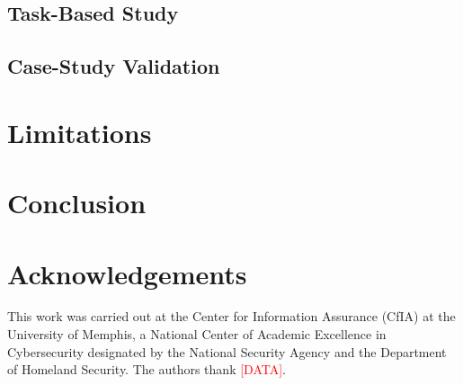 \documentclass[10pt,a4paper]{article}
\newif\ifshowguides
\newcommand{\guide}[1]{%
  \ifshowguides
    {\par\smallskip\footnotesize\color{guidecol}%
     \textbf{[guide]}~#1\par\smallskip}%
  \fi}
\newcommand{\needcite}{\textcolor{red}{[CITE]}}
\newcommand{\needdata}{\textcolor{red}{[DATA]}}
\begin{document}
\subsection{Task-Based Study}

\guide{\textbf{Load-bearing, and currently unrun.} There is no
cylinder-versus-flat-grid comparison anywhere in this work. Until one
exists, the curved surface is an aesthetic assertion. The minimum
credible study is a within-subjects lookup task --- ``find the cell for
facet~A~$\times$~facet~B'' --- timed on both layouts, and you should be
willing to report the result even if the grid wins.}

\subsection{Case-Study Validation}

\section{Limitations}

\section{Conclusion}

\section{Acknowledgements}

This work was carried out at the Center for Information Assurance
(CfIA) at the University of Memphis, a National Center of Academic
Excellence in Cybersecurity designated by the National Security Agency
and the Department of Homeland Security. The authors thank \needdata{}.

\guide{If any part of this work sits under a named CfIA grant --- the
NCAE-C critical-infrastructure cybersecurity award, for instance ---
name it and its number here. Funders generally require the
acknowledgement, and reviewers read this section for conflicts.}

\nocite{*}   %


\end{document}
